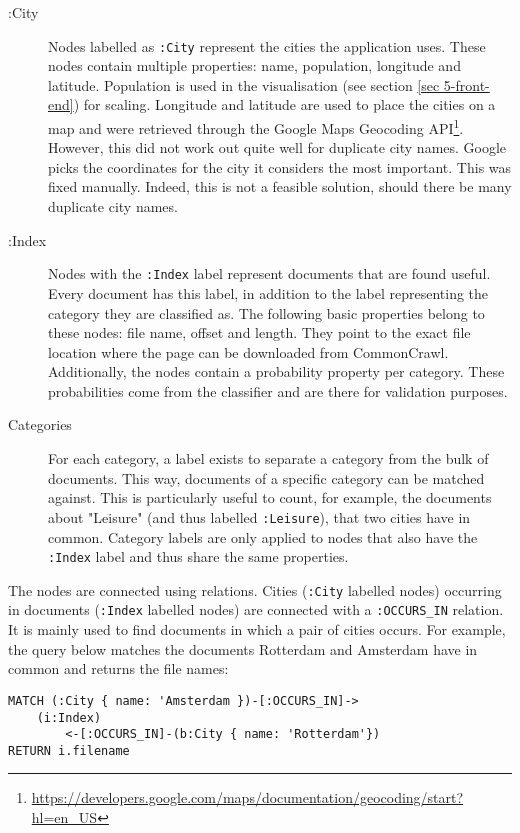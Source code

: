 \begin{description}
\item[:City] Nodes labelled as \texttt{:City} represent the cities the application uses. These nodes contain multiple properties: name, population, longitude and latitude. Population is used in the visualisation (see section \ref{sec 5-front-end}) for scaling. Longitude and latitude are used to place the cities on a map and were retrieved through the Google Maps Geocoding API\footnote{\url{https://developers.google.com/maps/documentation/geocoding/start?hl=en_US}}. However, this did not work out quite well for duplicate city names. Google picks the coordinates for the city it considers the most important. This was fixed manually. Indeed, this is not a feasible solution, should there be many duplicate city names.
\item[:Index] Nodes with the \texttt{:Index} label represent documents that are found useful. Every document has this label, in addition to the label representing the category they are classified as. The following basic properties belong to these nodes: file name, offset and length. They point to the exact file location where the page can be downloaded from CommonCrawl. Additionally, the nodes contain a probability property per category. These probabilities come from the classifier and are there for validation purposes.
\item[Categories] For each category, a label exists to separate a category from the bulk of documents. This way, documents of a specific category can be matched against. This is particularly useful to count, for example, the documents about "Leisure" (and thus labelled \texttt{:Leisure}), that two cities have in common. Category labels are only applied to nodes that also have the \texttt{:Index} label and thus share the same properties.
\end{description}

The nodes are connected using relations. Cities (\texttt{:City} labelled nodes) occurring in documents (\texttt{:Index} labelled nodes) are connected with a \texttt{:OCCURS\_IN} relation. It is mainly used to find documents in which a pair of cities occurs. For example, the query below matches the documents Rotterdam and Amsterdam have in common and returns the file names:

\begin{lstlisting}[language=cypher, caption={Querying documents containing two cities}, label={lst:query-occ}]
MATCH (:City { name: 'Amsterdam })-[:OCCURS_IN]->
    (i:Index)
        <-[:OCCURS_IN]-(b:City { name: 'Rotterdam'})
RETURN i.filename
\end{lstlisting}

